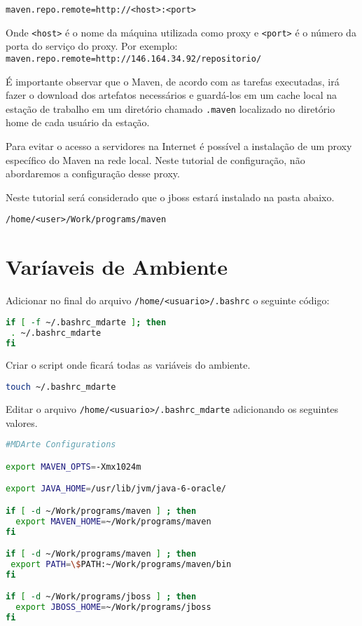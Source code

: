 \begin{verbatim}
maven.repo.remote=http://<host>:<port> 
\end{verbatim}

Onde \texttt{<host>} é o nome da máquina utilizada como proxy e \texttt{<port>} é o número da porta do serviço do proxy. Por exemplo: \texttt{maven.repo.remote=http://146.164.34.92/repositorio/}

É importante observar que o Maven, de acordo com as tarefas executadas, irá fazer o download dos artefatos necessários e guardá-los em um cache local na estação de trabalho em um diretório chamado \texttt{.maven} localizado no diretório home de cada usuário da estação. 

Para evitar o acesso a servidores na Internet é possível a instalação de um proxy específico do Maven na rede local. Neste tutorial de configuração, não abordaremos a configuração desse proxy.

Neste tutorial será considerado que o jboss estará instalado na pasta abaixo.

\begin{verbatim}
/home/<user>/Work/programs/maven
\end{verbatim}

\section{Varíaveis de Ambiente}

Adicionar no final do arquivo \texttt{/home/<usuario>/.bashrc} o seguinte código: 

\begin{lstlisting}[language=bash]
if [ -f ~/.bashrc_mdarte ]; then
 . ~/.bashrc_mdarte
fi
\end{lstlisting}

Criar o script onde ficará todas as variáveis do ambiente. 

\begin{lstlisting}[language=bash]
touch ~/.bashrc_mdarte
\end{lstlisting}
	
Editar o arquivo \texttt{/home/<usuario>/.bashrc\_mdarte} adicionando os seguintes valores. 

\begin{lstlisting}[language=bash]
#MDArte Configurations

export MAVEN_OPTS=-Xmx1024m

export JAVA_HOME=/usr/lib/jvm/java-6-oracle/

if [ -d ~/Work/programs/maven ] ; then
  export MAVEN_HOME=~/Work/programs/maven
fi

if [ -d ~/Work/programs/maven ] ; then
 export PATH=\$PATH:~/Work/programs/maven/bin
fi

if [ -d ~/Work/programs/jboss ] ; then
  export JBOSS_HOME=~/Work/programs/jboss
fi
\end{lstlisting}


